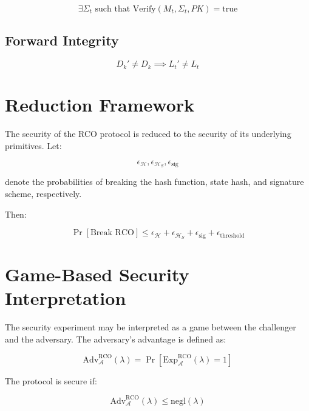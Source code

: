 \begin{equation}
\exists \Sigma_t \text{ such that } \text{Verify}(M_t, \Sigma_t, PK) = \text{true}
\end{equation}

\subsection{Forward Integrity}

\begin{equation}
D_k' \neq D_k \implies L_t' \neq L_t
\end{equation}

\section{Reduction Framework}

The security of the RCO protocol is reduced to the security of its underlying primitives. Let:

\begin{equation}
\epsilon_{\mathcal{H}}, \epsilon_{\mathcal{H}_S}, \epsilon_{\text{sig}}
\end{equation}

denote the probabilities of breaking the hash function, state hash, and signature scheme, respectively.

Then:

\begin{equation}
\Pr[\text{Break RCO}] \leq \epsilon_{\mathcal{H}} + \epsilon_{\mathcal{H}_S} + \epsilon_{\text{sig}} + \epsilon_{\text{threshold}}
\end{equation}

\section{Game-Based Security Interpretation}

The security experiment may be interpreted as a game between the challenger and the adversary. The adversary’s advantage is defined as:

\begin{equation}
\text{Adv}_{\mathcal{A}}^{\text{RCO}}(\lambda) =
\Pr[\text{Exp}_{\mathcal{A}}^{\text{RCO}}(\lambda) = 1]
\end{equation}

The protocol is secure if:

\begin{equation}
\text{Adv}_{\mathcal{A}}^{\text{RCO}}(\lambda) \leq \text{negl}(\lambda)
\end{equation}

